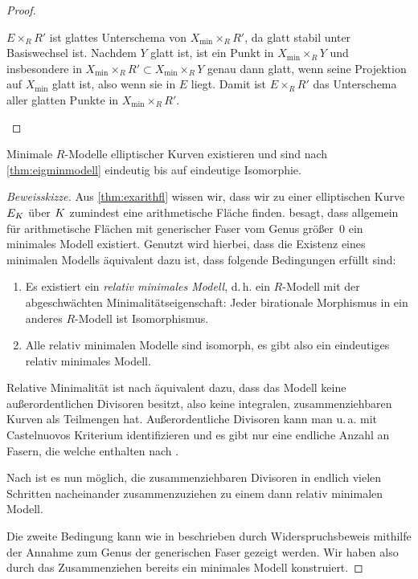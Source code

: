 \documentclass[german, bibliography=totoc]{scrreprt}
\begin{document}
\begin{Satz}
\begin{proof}
\begin{enumerate}[label=(\roman*)]
      $E\times_R R'$ ist glattes Unterschema von
      $X_{\text{min}}\times_R R'$, da glatt stabil unter Basiswechsel
      ist. Nachdem $Y$ glatt ist, ist ein Punkt in
      $X_{\text{min}}\times_R Y$ und insbesondere in
      $X_{\text{min}}\times_R R'\subset
      X_{\text{min}}\times_R Y$ genau dann glatt, wenn seine
      Projektion auf $X_{\text{min}}$ glatt ist, also wenn sie in $E$
      liegt. Damit ist $E\times_R R'$ das Unterschema aller glatten
      Punkte in $X_{\text{min}}\times_R R'$.
    \end{enumerate}
  \end{proof}
\end{Satz}

\begin{Satz}\label{thm:exminmodell}
  Minimale $R$-Modelle elliptischer Kurven existieren und sind nach
  \ref{thm:eigminmodell} eindeutig bis auf eindeutige Isomorphie.
  \begin{proof}[Beweisskizze]
    Aus \ref{thm:exarithfl} wissen wir, dass wir zu einer elliptischen
    Kurve $E_{K}$ über $K$ zumindest eine arithmetische Fläche finden.
    \cite[Theorem 9.3.21]{liu} besagt, dass allgemein für
    arithmetische Flächen mit generischer Faser vom Genus größer~0 ein
    minimales Modell existiert.
    Genutzt wird hierbei, dass die Existenz eines minimalen Modells
    äquivalent dazu ist, dass folgende Bedingungen erfüllt sind:
    \begin{enumerate}[label=(\alph*)]
    \item Es existiert ein \emph{relativ minimales Modell}, d.\,h. ein
      $R$-Modell mit der abgeschwächten Minimalitätseigenschaft:
      Jeder birationale Morphismus in ein anderes $R$-Modell ist
      Isomorphismus.
    \item Alle relativ minimalen Modelle sind isomorph, es gibt also
      ein eindeutiges relativ minimales Modell.
    \end{enumerate}
    Relative Minimalität ist nach \cite[Theorem 9.2.2]{liu} äquivalent
    dazu, dass das Modell keine außerordentlichen Divisoren besitzt,
    also keine integralen, zusammenziehbaren Kurven als Teilmengen
    hat.
    Außerordentliche Divisoren kann man u.\,a. mit Castelnuovos
    Kriterium \cite[Theorem 9.3.8]{liu} identifizieren und es gibt nur
    eine endliche Anzahl an Fasern, die welche enthalten nach
    \cite[Lemma 9.3.17]{liu}.

    Nach \cite[Proposition 9.3.19]{liu} ist es nun möglich, die
    zusammenziehbaren Divisoren in endlich vielen Schritten
    nacheinander zusammenzuziehen zu einem dann relativ minimalen
    Modell.

    Die zweite Bedingung kann wie in \cite[Theorem 9.3.21]{liu}
    beschrieben durch Widerspruchsbeweis mithilfe der Annahme zum
    Genus der generischen Faser gezeigt werden.
    Wir haben also durch das Zusammenziehen bereits ein minimales
    Modell konstruiert.
  \end{proof}
\end{Satz}
\end{document}
